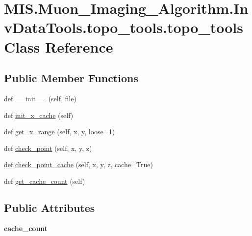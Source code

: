 \hypertarget{classMIS_1_1Muon__Imaging__Algorithm_1_1InvDataTools_1_1topo__tools_1_1topo__tools}{}\section{M\+I\+S.\+Muon\+\_\+\+Imaging\+\_\+\+Algorithm.\+Inv\+Data\+Tools.\+topo\+\_\+tools.\+topo\+\_\+tools Class Reference}
\label{classMIS_1_1Muon__Imaging__Algorithm_1_1InvDataTools_1_1topo__tools_1_1topo__tools}
\subsection*{Public Member Functions}
\begin{DoxyCompactItemize}
\item 
def \hyperlink{classMIS_1_1Muon__Imaging__Algorithm_1_1InvDataTools_1_1topo__tools_1_1topo__tools_aa462f15b8190fe7c8b1cdc99a41fd6f9}{\+\_\+\+\_\+init\+\_\+\+\_\+} (self, file)
\item 
def \hyperlink{classMIS_1_1Muon__Imaging__Algorithm_1_1InvDataTools_1_1topo__tools_1_1topo__tools_ab6ace6a26214199ba30804a28d8270b4}{init\+\_\+x\+\_\+cache} (self)
\item 
def \hyperlink{classMIS_1_1Muon__Imaging__Algorithm_1_1InvDataTools_1_1topo__tools_1_1topo__tools_acde2fd86f894c2b8ff59b38754b8cf4a}{get\+\_\+x\+\_\+range} (self, x, y, loose=1)
\item 
def \hyperlink{classMIS_1_1Muon__Imaging__Algorithm_1_1InvDataTools_1_1topo__tools_1_1topo__tools_ace7c0ae7ec7f5510b86162a7e7beff41}{check\+\_\+point} (self, x, y, z)
\item 
def \hyperlink{classMIS_1_1Muon__Imaging__Algorithm_1_1InvDataTools_1_1topo__tools_1_1topo__tools_a2c9313d7223d60edf806d11b58a35580}{check\+\_\+point\+\_\+cache} (self, x, y, z, cache=True)
\item 
def \hyperlink{classMIS_1_1Muon__Imaging__Algorithm_1_1InvDataTools_1_1topo__tools_1_1topo__tools_ae61c4118f02e9c33db952c82f9704fcd}{get\+\_\+cache\+\_\+count} (self)
\end{DoxyCompactItemize}
\subsection*{Public Attributes}
\begin{DoxyCompactItemize}
\item 
\mbox{\label{classMIS_1_1Muon__Imaging__Algorithm_1_1InvDataTools_1_1topo__tools_1_1topo__tools_a9dafb06fadbe7f83b26c92f5094b1c91}} 
{\bfseries cache\+\_\+count}
\end{DoxyCompactItemize}


